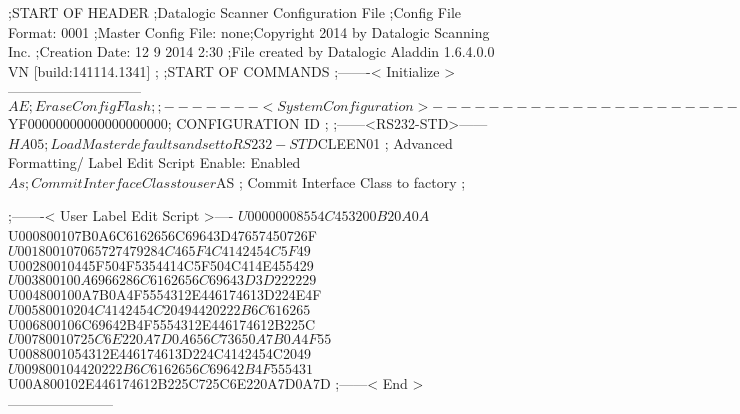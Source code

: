 ;START OF HEADER
;Datalogic Scanner Configuration File
;Config File Format: 0001
;Master Config File: none;Copyright 2014 by Datalogic Scanning Inc.
;Creation Date: 12 9 2014 2:30
;File created by Datalogic Aladdin 1.6.4.0.0 VN [build:141114.1341]
;
;START OF COMMANDS
;-------< Initialize >-----------------------------
$AE                 ; Erase Config Flash
;
;-------< System Configuration >-------------------------------
$YF00000000000000000000; CONFIGURATION ID
;
;------<RS232-STD>------
$HA05              ; Load Master defaults and set to RS232-STD
$CLEEN01            ; Advanced Formatting/ Label Edit Script Enable: Enabled
$As                 ; Commit Interface Class to user
$AS                 ; Commit Interface Class to factory
;

;-------< User Label Edit Script >----
$U00000008554C453200B20A0A
$U000800107B0A6C6162656C69643D47657450726F
$U001800107065727479284C465F4C4142454C5F49
$U00280010445F504F5354414C5F504C414E455429
$U003800100A6966286C6162656C69643D3D222229
$U004800100A7B0A4F5554312E446174613D224E4F
$U00580010204C4142454C20494420222B6C616265
$U006800106C69642B4F5554312E446174612B225C
$U00780010725C6E220A7D0A656C73650A7B0A4F55
$U0088001054312E446174613D224C4142454C2049
$U009800104420222B6C6162656C69642B4F555431
$U00A800102E446174612B225C725C6E220A7D0A7D
;------< End >-----------------------
